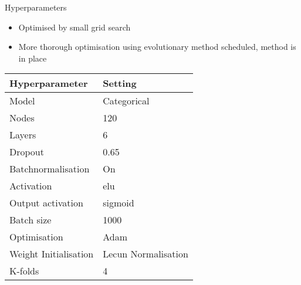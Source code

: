 \begin{frame}{Hyperparameters}
  \begin{itemize}
    \item Optimised by small grid search
    \item More thorough optimisation using evolutionary method scheduled, method is in place
  \end{itemize}
    \begin{table}[]
    \begin{tabular}{|l|l|}
    \hline
    Hyperparameter          &     Setting              \\ \hline
    Model                   &     Categorical          \\ \hline
    Nodes                   &     120                  \\ \hline
    Layers                  &     6                    \\ \hline
    Dropout                 &     0.65                 \\ \hline
    Batchnormalisation      &     On                   \\ \hline
    Activation              &     elu                  \\ \hline
    Output activation       &     sigmoid              \\ \hline
    Batch size              &     1000                 \\ \hline
    Optimisation            &     Adam                 \\ \hline
    Weight Initialisation   &     Lecun Normalisation  \\ \hline
    K-folds                 &     4                    \\ \hline
    \end{tabular}
    \end{table}
\end{frame}
  

